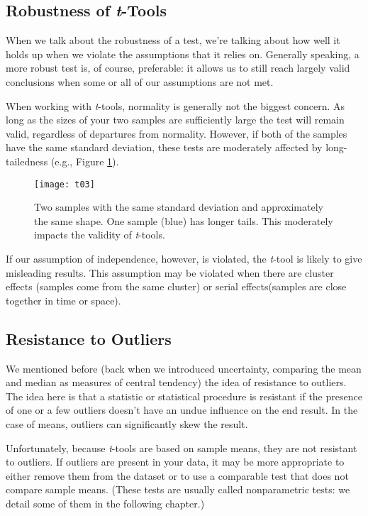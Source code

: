 \subsection{Robustness of \textit{t}-Tools}

When we talk about the robustness of a test, we're talking about how well it holds up when we violate the assumptions that it relies on. Generally speaking, a more robust test is, of course, preferable: it allows us to still reach largely valid conclusions when some or all of our assumptions are not met.

When working with \textit{t}-tools, normality is generally not the biggest concern. As long as the sizes of your two samples are sufficiently large the test will remain valid, regardless of departures from normality. However, if both of the samples have the same standard deviation, these tests are moderately affected by long-tailedness (e.g., Figure \ref{fig:t04}).

\begin{figure}[htp]
\texttt{[image: t03]}
\caption{Two samples with the same standard deviation and approximately the same shape. One sample (blue) has longer tails. This moderately impacts the validity of \textit{t}-tools.}
\label{fig:t04}
\end{figure} 

If our assumption of independence, however, is violated, the \textit{t}-tool is likely to give misleading results. This assumption may be violated when there are cluster effects (samples come from the same cluster) or serial effects(samples are close together in time or space). 

\subsection{Resistance to Outliers}

We mentioned before (back when we introduced uncertainty, comparing the mean and median as measures of central tendency) the idea of resistance to outliers. The idea here is that a statistic or statistical procedure is resistant if the presence of one or a few outliers doesn't have an undue influence on the end result. In the case of means, outliers can significantly skew the result.

Unfortunately, because \textit{t}-tools are based on sample means, they are not resistant to outliers. If outliers are present in your data, it may be more appropriate to either remove them from the dataset or to use a comparable test that does not compare sample means. (These tests are usually called nonparametric tests: we detail some of them in the following chapter.)

